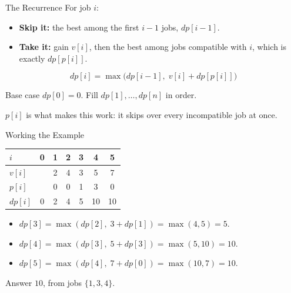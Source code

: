 \documentclass[10pt,aspectratio=169]{beamer}
\begin{document}
\begin{frame}{The Recurrence}
  For job $i$:

  \begin{itemize}
    \item \textbf{Skip it:} the best among the first $i-1$ jobs, $dp[i-1]$.
    \pause
    \item \textbf{Take it:} gain $v[i]$, then the best among jobs compatible with
          $i$, which is exactly $dp[p[i]]$.
  \end{itemize}

  \pause
  \bigskip
  \begin{alertblock}{}
    \[
      dp[i] = \max\big( dp[i-1],\; v[i] + dp[p[i]] \big)
    \]
  \end{alertblock}

  \bigskip
  Base case $dp[0] = 0$. Fill $dp[1], \ldots, dp[n]$ in order.

  \bigskip
  \begin{center}
    \small $p[i]$ is what makes this work: it skips over every incompatible job
    at once.
  \end{center}
\end{frame}

\begin{frame}{Working the Example}
  \begin{center}
  \begin{tabular}{lcccccc}
    \toprule
    $i$      & 0 & 1 & 2 & 3 & 4 & 5 \\
    \midrule
    $v[i]$   &   & 2 & 4 & 3 & 5 & 7 \\
    $p[i]$   &   & 0 & 0 & 1 & 3 & 0 \\
    \midrule
    $dp[i]$  & 0 & 2 & 4 & 5 & \alert{10} & 10 \\
    \bottomrule
  \end{tabular}
  \end{center}

  \bigskip
  \begin{itemize}
    \item $dp[3] = \max(dp[2],\; 3 + dp[1]) = \max(4, 5) = 5$.
    \item $dp[4] = \max(dp[3],\; 5 + dp[3]) = \max(5, 10) = 10$.
    \item $dp[5] = \max(dp[4],\; 7 + dp[0]) = \max(10, 7) = 10$.
  \end{itemize}

  \bigskip
  \begin{center}
    Answer $10$, from jobs $\{1, 3, 4\}$.
  \end{center}
\end{frame}
\end{document}
